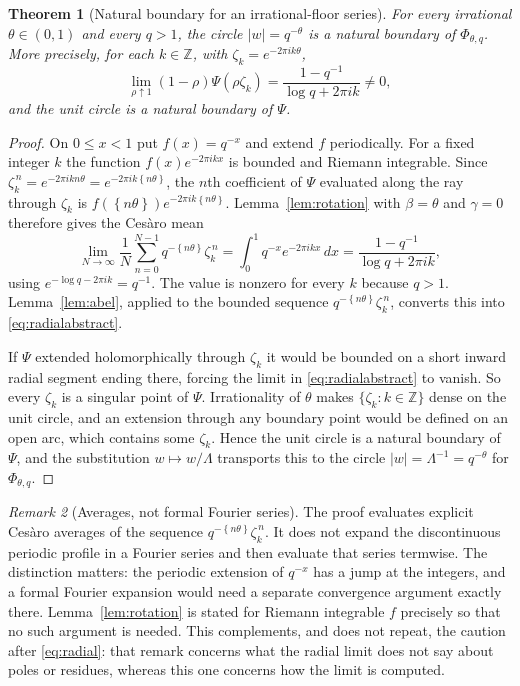\documentclass[11pt,letterpaper]{article}
\numberwithin{equation}{section}
\newtheorem{theorem}{Theorem}[section]
\theoremstyle{definition}
\theoremstyle{remark}
\newtheorem{remark}[theorem]{Remark}
\newcommand{\Z}{\mathbb{Z}}
\newcommand{\fracpart}[1]{\left\{#1\right\}}
\begin{document}
\begin{theorem}[Natural boundary for an irrational-floor series]
\label{thm:floorboundary}
For every irrational $\theta\in(0,1)$ and every $q>1$, the circle
$|w|=q^{-\theta}$ is a natural boundary of $\Phi_{\theta,q}$. More precisely,
for each $k\in\Z$, with $\zeta_k=e^{-2\pi ik\theta}$,
\begin{equation}\label{eq:radialabstract}
 \lim_{\rho\uparrow1}(1-\rho)\Psi(\rho\zeta_k)
 =\frac{1-q^{-1}}{\log q+2\pi ik}\ne0,
\end{equation}
and the unit circle is a natural boundary of $\Psi$.
\end{theorem}
\begin{proof}
On $0\le x<1$ put $f(x)=q^{-x}$ and extend $f$ periodically. For a fixed
integer $k$ the function $f(x)e^{-2\pi ikx}$ is bounded and Riemann
integrable. Since
$\zeta_k^{\,n}=e^{-2\pi ikn\theta}=e^{-2\pi ik\fracpart{n\theta}}$,
the $n$th coefficient of $\Psi$ evaluated along the ray through $\zeta_k$ is
$f(\fracpart{n\theta})e^{-2\pi ik\fracpart{n\theta}}$. Lemma~\ref{lem:rotation}
with $\beta=\theta$ and $\gamma=0$ therefore gives the Ces\`aro mean
\[
 \lim_{N\to\infty}\frac1N\sum_{n=0}^{N-1}q^{-\fracpart{n\theta}}\zeta_k^{\,n}
 =\int_0^1q^{-x}e^{-2\pi ikx}\,dx
 =\frac{1-q^{-1}}{\log q+2\pi ik},
\]
using $e^{-\log q-2\pi ik}=q^{-1}$. The value is nonzero for every $k$
because $q>1$. Lemma~\ref{lem:abel}, applied to the bounded sequence
$q^{-\fracpart{n\theta}}\zeta_k^{\,n}$, converts this into
\eqref{eq:radialabstract}.

If $\Psi$ extended holomorphically through $\zeta_k$ it would be bounded on
a short inward radial segment ending there, forcing the limit in
\eqref{eq:radialabstract} to vanish. So every $\zeta_k$ is a singular point
of $\Psi$. Irrationality of $\theta$ makes $\{\zeta_k:k\in\Z\}$ dense on the
unit circle, and an extension through any boundary point would be defined on
an open arc, which contains some $\zeta_k$. Hence the unit circle is a
natural boundary of $\Psi$, and the substitution $w\mapsto w/\Lambda$
transports this to the circle $|w|=\Lambda^{-1}=q^{-\theta}$ for
$\Phi_{\theta,q}$.
\end{proof}

\begin{remark}[Averages, not formal Fourier series]\label{rem:fourier}
The proof evaluates explicit Ces\`aro averages of the sequence
$q^{-\fracpart{n\theta}}\zeta_k^{\,n}$. It does not expand the discontinuous
periodic profile in a Fourier series and then evaluate that series
termwise. The distinction matters: the periodic extension of $q^{-x}$ has a
jump at the integers, and a formal Fourier expansion would need a separate
convergence argument exactly there. Lemma~\ref{lem:rotation} is stated for
Riemann integrable $f$ precisely so that no such argument is needed. This
complements, and does not repeat, the caution after \eqref{eq:radial}: that
remark concerns what the radial limit does not say about poles or residues,
whereas this one concerns how the limit is computed.
\end{remark}
\end{document}
